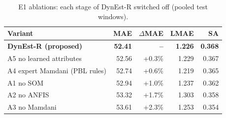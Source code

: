 \begin{table}[t]
\centering
\small
\caption{E1 ablations: each stage of DynEst-R switched off (pooled test windows).}
\label{tab:ablation-tawos}
\begin{tabular}{lrrrr}
\toprule
Variant & MAE & $\Delta$MAE & LMAE & SA \\
\midrule
\textbf{DynEst-R (proposed)} & \textbf{52.41} & \textbf{--} & \textbf{1.226} & \textbf{0.368} \\
A5 no learned attributes & 52.56 & +0.3\% & 1.229 & 0.367 \\
A4 expert Mamdani (PBL rules) & 52.74 & +0.6\% & 1.219 & 0.365 \\
A1 no SOM & 52.94 & +1.0\% & 1.237 & 0.362 \\
A2 no ANFIS & 53.32 & +1.7\% & 1.303 & 0.358 \\
A3 no Mamdani & 53.61 & +2.3\% & 1.253 & 0.354 \\
\bottomrule
\end{tabular}
\end{table}
